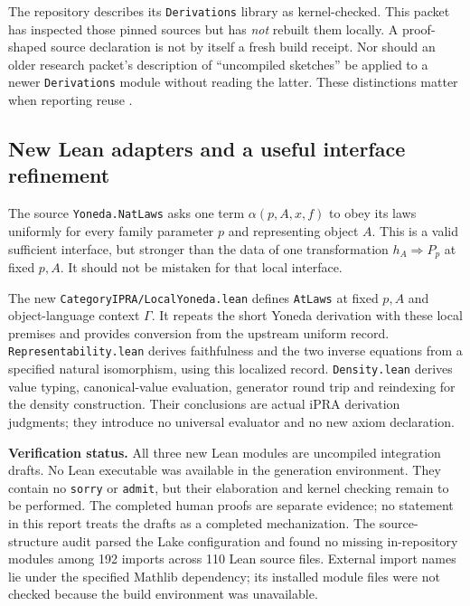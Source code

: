 The repository describes its \texttt{Derivations} library as kernel-checked.
This packet has inspected those pinned sources but has \emph{not} rebuilt
them locally. A proof-shaped source declaration is not by itself a fresh
build receipt. Nor should an older research packet's description of
``uncompiled sketches'' be applied to a newer \texttt{Derivations} module
without reading the latter. These distinctions matter when reporting reuse
\cite{repo-readme,repo-presented,repo-yoneda,repo-adjunction}.

\subsection{New Lean adapters and a useful interface refinement}
The source \texttt{Yoneda.NatLaws} asks one term
$\alpha(p,A,x,f)$ to obey its laws uniformly for every family parameter
$p$ and representing object $A$. This is a valid sufficient interface,
but stronger than the data of one transformation $h_A\Rightarrow P_p$
at fixed $p,A$. It should not be mistaken for that local interface.

The new \texttt{CategoryIPRA/LocalYoneda.lean} defines
\texttt{AtLaws} at fixed $p,A$ and object-language context $\Gamma$.
It repeats the short Yoneda derivation with these local premises and
provides conversion from the upstream uniform record.
\texttt{Representability.lean} derives faithfulness and the two inverse
equations from a specified natural isomorphism, using this localized
record. \texttt{Density.lean} derives value typing, canonical-value
evaluation, generator round trip and reindexing for the density
construction. Their conclusions are actual iPRA derivation judgments;
they introduce no universal evaluator and no new axiom declaration.

\textbf{Verification status.} All three new Lean modules are uncompiled
integration drafts. No Lean executable was available in the generation
environment. They contain no \texttt{sorry} or \texttt{admit}, but their
elaboration and kernel checking remain to be performed. The completed
human proofs are separate evidence; no statement in this report treats
the drafts as a completed mechanization. The source-structure audit
parsed the Lake configuration and found no missing in-repository modules
among 192 imports across 110 Lean source files. External import names lie
under the specified Mathlib dependency; its installed module files were
not checked because the build environment was unavailable.

